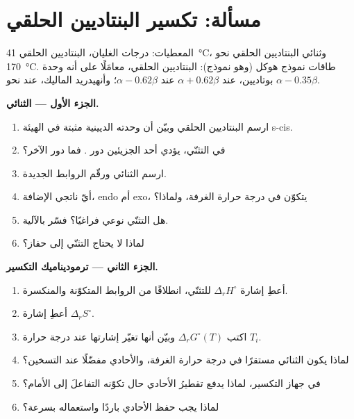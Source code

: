 \section{مسألة: تكسير البنتاديين الحلقي}

\begin{problem}
\label{pb:b2:frontier-orbitals:1}
المعطيات: درجات الغليان، البنتاديين الحلقي \qty{41}{\degreeCelsius}، وثنائي البنتاديين الحلقي نحو
\qty{170}{\degreeCelsius}. طاقات نموذج هوكل (وهو نموذج): البنتاديين الحلقي، معامَلًا على أنه
وحدة بوتاديين،  عند $\alpha + 0.62\beta$  عند $\alpha - 0.62\beta$؛ وأنهيدريد الماليك، 
عند نحو $\alpha - 0.35\beta$.

\medskip
\noindent\textbf{الجزء الأول --- الثنائي.}
\begin{enumerate}
  \item ارسم البنتاديين الحلقي وبيّن أن وحدته الديينية مثبتة في الهيئة s-cis.
  \item في التثنّي، يؤدي أحد الجزيئين دور . فما دور الآخر؟
  \item ارسم الثنائي ورقّم الروابط الجديدة.
  \item أيّ ناتجي الإضافة، endo أم exo، يتكوّن في درجة حرارة الغرفة، ولماذا؟
  \item هل التثنّي نوعي فراغيًا؟ فسّر بالآلية.
  \item لماذا لا يحتاج التثنّي إلى حفاز؟
\end{enumerate}

\medskip
\noindent\textbf{الجزء الثاني --- ترموديناميك التكسير.}
\begin{enumerate}[resume]
  \item أعطِ إشارة $\Delta_r H^\circ$ للتثنّي، انطلاقًا من الروابط المتكوّنة 
        والمنكسرة.
  \item أعطِ إشارة $\Delta_r S^\circ$.
  \item اكتب $\Delta_r G^\circ(T)$ وبيّن أنها تغيّر إشارتها عند درجة حرارة $T_i$.
  \item لماذا يكون الثنائي مستقرًا في درجة حرارة الغرفة، والأحادي مفضّلًا عند التسخين؟
  \item في جهاز التكسير، لماذا يدفع تقطيرُ الأحادي حال تكوّنه
        التفاعلَ إلى الأمام؟
  \item لماذا يجب حفظ الأحادي باردًا واستعماله بسرعة؟
\end{enumerate}


\end{problem}
